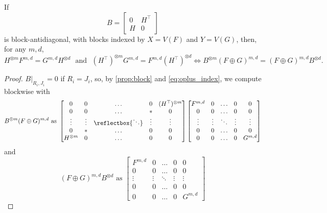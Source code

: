 \documentclass{article}
\providecommand{\iddots}{\mathinner{\reflectbox{\ensuremath{\ddots}}}}
\begin{document}
\begin{corollary}
\label{cor:off_diag_block}
If
\[
    B = \begin{bmatrix} 0 & H^\top \\ H & 0 \end{bmatrix}
\]
is block-antidiagonal, with blocks indexed by $X = V(F)$ and $Y = V(G)$, then, for any $m,d$,
\[
    H^{\otimes m}F^{m,d} = G^{m,d}H^{\otimes d} \text{~~and~~}
    (H^\top)^{\otimes m}G^{m,d} = F^{m,d}(H^\top)^{\otimes d}
    \iff 
    B^{\otimes m}(F \oplus G)^{m,d} = (F \oplus G)^{m,d}B^{\otimes d}.
\]
\end{corollary}
\begin{proof}
    $B|_{R_i,J_i} = 0$ if $R_i = J_i$, so, by \autoref{prop:block} and \eqref{eq:oplus_index}, 
    we compute blockwise with
    \begin{equation}
        B^{\otimes m}(F \oplus G)^{m,d} \text{ as }
        \begin{bmatrix} 
            0 & 0 & \ldots & 0 & (H^\top)^{\otimes m}\\
            0 & 0 & \ldots & * & 0\\
            \vdots & \vdots & \iddots & \vdots & \vdots \\
            0 & * & \ldots & 0 & 0\\
            H^{\otimes m} & 0 & \ldots & 0 & 0
        \end{bmatrix}
        \begin{bmatrix} 
            F^{m,d} & 0 & \ldots & 0 & 0\\
            0 & 0 &\ldots & 0 & 0\\
            \vdots & \vdots & \ddots & \vdots & \vdots\\
            0 & 0 &\ldots & 0 & 0\\
            0 & 0 & \ldots & 0 & G^{m,d}
        \end{bmatrix}
        \label{eq:hmkmd}
    \end{equation}
    and
    \begin{equation}
        (F \oplus G)^{m,d} B^{\otimes d} \text{ as }
        \begin{bmatrix} 
            F^{m,d} & 0 & \ldots & 0 & 0\\
            0 & 0 &\ldots & 0 & 0\\
            \vdots & \vdots & \ddots & \vdots & \vdots\\
            0 & 0 &\ldots & 0 & 0\\
            0 & 0 & \ldots & 0 & G^{m,d}
        \end{bmatrix}

\end{equation}
\end{proof}
\end{document}
